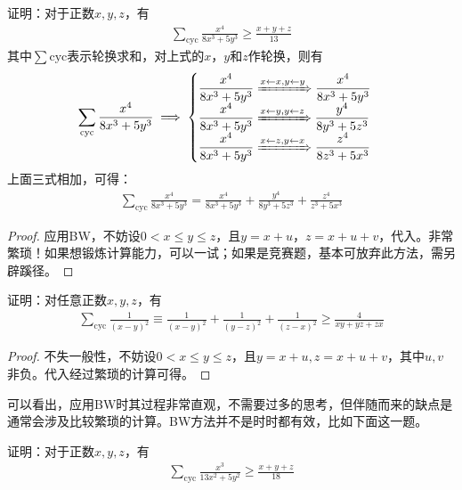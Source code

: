\begin{example}
  证明：对于正数$x,y,z$，有
  \begin{align*}
    \sum_{\mathrm{cyc}} \frac{x^4}{8x^3+5y^3}\ge\frac{x+y+z}{13}
  \end{align*}
  其中$\sum\limits{\mathrm{cyc}}$表示轮换求和，对上式的$x$，$y$和$z$作轮换，则有
  \begin{align*}
    \sum_{\mathrm{cyc}}\frac{x^4}{8x^3+5y^3} \implies
    \begin{cases}
      \dfrac{x^4}{8x^3+5y^3} \xRightarrow{x\leftarrow x, y\leftarrow y} \dfrac{x^4}{8x^3+5y^3} \\
      \dfrac{x^4}{8x^3+5y^3} \xRightarrow{x\leftarrow y, y\leftarrow z} \dfrac{y^4}{8y^3+5z^3} \\
      \dfrac{x^4}{8x^3+5y^3} \xRightarrow{x\leftarrow z, y\leftarrow x} \dfrac{z^4}{8z^3+5x^3}
    \end{cases}%
  \end{align*}
  上面三式相加，可得：
  \begin{align*}
    \sum_{\mathrm{cyc}} \frac{x^4}{8x^3+5y^3} = \frac{x^4}{8x^3+5y^3}
    + \frac{y^4}{8y^3+5z^3}
    + \frac{z^4}{z^3+5x^3}
  \end{align*}
\end{example}
\begin{proof}
  应用BW，不妨设$0<x\le y\le z$，且$y=x+u$，$z=x+u+v$，代入。{\color{red}非常繁琐！如果想锻炼计算能力，可以一试；如果是竞赛题，基本可放弃此方法，需另辟蹊径。}
\end{proof}

\begin{example}
  证明：对任意正数$x,y,z$，有
  \begin{align*}
    \sum_{\mathrm{cyc}}\frac1{(x-y)^2}\equiv\frac1{(x-y)^2}+\frac1{(y-z)^2}+\frac1{(z-x)^2}\ge\frac4{xy+yz+zx}
  \end{align*}
\end{example}
\begin{proof}
  不失一般性，不妨设$0<x\le y\le z$，且$y=x+u,z=x+u+v$，其中$u,v$非负。代入经过繁琐的计算可得。
\end{proof}


可以看出，应用BW时其过程非常直观，不需要过多的思考，但伴随而来的缺点是通常会涉及比较繁琐的计算。BW方法并不是时时都有效，比如下面这一题。
\begin{example}
  证明：对于正数$x,y,z$，有
  \begin{align*}
    \sum_{\mathrm{cyc}} \frac{x^3}{13x^2+5y^2}\ge\frac{x+y+z}{18}
  \end{align*}
\end{example}
